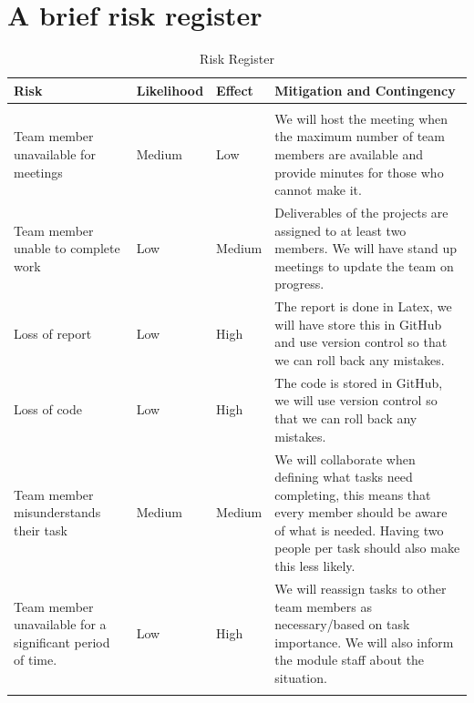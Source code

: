 \documentclass{article}
\begin{document}

\section{A brief risk register}

\begin{longtable}{p{}p{}p{}p{}}
    \toprule
    Risk & Likelihood & Effect & Mitigation and Contingency \\ \midrule
    \hline \\
    Team member unavailable for meetings                      & Medium     & Low    & We will host the meeting when the maximum number of team members are available and provide minutes for those who cannot make it.                                                             \\
    Team member unable to complete work                       & Low        & Medium & Deliverables of the projects are assigned to at least two members. We will have stand up meetings to update the team on progress.                                                           \\
    Loss of report                                            & Low        & High   & The report is done in Latex, we will have store this in GitHub and use version control so that we can roll back any mistakes.                                                               \\
    Loss of code                                              & Low        & High   & The code is stored in GitHub, we will use version control so that we can roll back any mistakes.                                                                                            \\
    Team member misunderstands their task                     & Medium     & Medium & We will collaborate when defining what tasks need completing, this means that every member should be aware of what is needed. Having two people per task should also make this less likely. \\
    Team member unavailable for a significant period of time. & Low        & High   & We will reassign tasks to other team members as necessary/based on task importance. We will also inform the module staff about the situation. \\ \bottomrule
    \caption{Risk Register}
    \label{tab:RiskRegister}
\end{longtable}
\end{document}
